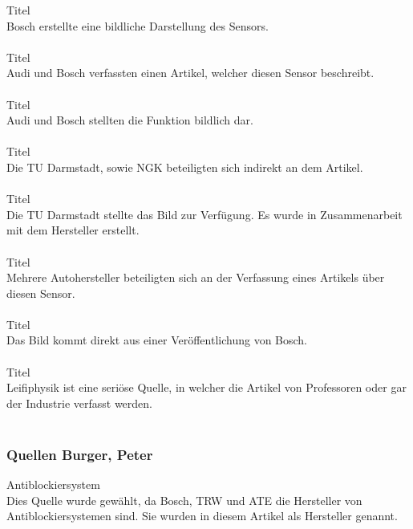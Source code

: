 Titel \cite{TS_hall_pic}\\
Bosch erstellte eine bildliche Darstellung des Sensors.\\\\

Titel \cite{TS_drehzahl_sensor}\\
Audi und Bosch verfassten einen Artikel, welcher diesen Sensor beschreibt. \\\\

Titel \cite{TS_drehzahl_sensor_pic}\\
Audi und Bosch stellten die Funktion bildlich dar.\\\\

Titel \cite{TS_lambda}\\
Die TU Darmstadt, sowie NGK beteiligten sich indirekt an dem Artikel.\\\\

Titel \cite{TS_lambda_pic}\\
Die TU Darmstadt stellte das Bild zur Verfügung. Es wurde in Zusammenarbeit mit dem Hersteller erstellt.\\\\

Titel \cite{TS_airbag}\\
Mehrere Autohersteller beteiligten sich an der Verfassung eines Artikels über diesen Sensor.\\\\

Titel \cite{TS_ultraschall_pic}\\
Das Bild kommt direkt aus einer Veröffentlichung von Bosch.\\\\

Titel \cite{TS_kamera_pic}\\
Leifiphysik ist eine seriöse Quelle, in welcher die Artikel von Professoren oder gar der Industrie verfasst werden.\\\\

\subsubsection{Quellen Burger, Peter}

Antiblockiersystem \cite{antiblockiersys.PB1}\\
Dies Quelle wurde gewählt, da Bosch, TRW und ATE die Hersteller von Antiblockiersystemen sind. Sie wurden in diesem Artikel als Hersteller genannt.\\\\


